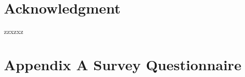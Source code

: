 \documentclass[conference]{IEEEtran}
\begin{document}


\section*{Acknowledgment}


zzxzxz


\fi

\appendices

\section {Appendix A Survey Questionnaire}



\end{document}

